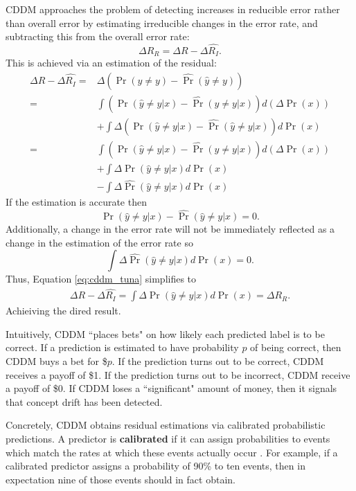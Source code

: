 CDDM approaches the problem of detecting increases in reducible error rather than overall error by estimating irreducible changes in the error rate, and subtracting this from the overall error rate:
\begin{equation}
	\Delta R_R = \Delta R - \Delta \hat{R_I}.
\end{equation}
This is achieved via an estimation of the residual:
\begin{align}
	\Delta R - \Delta \hat{R_I} =& \Delta \left( \Pr(\hat{y}\ne y) - \hat{\Pr}(\hat{y}\ne y) \right) \label{eq:cddm_tuna} \\
	=& \int \left( \Pr(\hat{y}\ne y|x) - \hat{\Pr}(\hat{y}\ne y|x) \right) d\left(\Delta \Pr(x)\right) \\
	 &+ \int \Delta \left( \Pr(\hat{y}\ne y|x) - \hat{\Pr}(\hat{y}\ne y|x) \right) d\Pr(x) \\
	=& \int \left( \Pr(\hat{y}\ne y|x) - \hat{\Pr}(\hat{y}\ne y|x) \right) d\left(\Delta \Pr(x)\right) \\
	 &+ \int \Delta \Pr(\hat{y}\ne y|x) d\Pr(x) \\
	 &- \int \Delta \hat{\Pr}(\hat{y}\ne y|x) d\Pr(x)
\end{align}
If the estimation is accurate then
\begin{equation}
	\Pr(\hat{y}\ne y|x) - \hat{\Pr}(\hat{y}\ne y|x) = 0.
\end{equation}
Additionally, a change in the error rate will not be immediately reflected as a change in the estimation of the error rate so 
\begin{equation}
	 \int \Delta \hat{\Pr}(\hat{y}\ne y|x) d\Pr(x) = 0.
\end{equation}
Thus, Equation \ref{eq:cddm_tuna} simplifies to
\begin{align}
	\Delta R - \Delta \hat{R_I} = \int \Delta \Pr(\hat{y}\ne y|x) d\Pr(x) = \Delta R_R.
\end{align}
Achieiving the dired result.

Intuitively, CDDM ``places bets" on how likely each predicted label is to be correct. If a prediction is estimated to have probability $p$ of being correct, then CDDM buys a bet for \$$p$. If the prediction turns out to be correct, CDDM receives a payoff of \$1. If the prediction turns out to be incorrect, CDDM receive a payoff of \$0. If CDDM loses a ``significant" amount of money, then it signals that concept drift has been detected.

Concretely, CDDM obtains residual estimations via calibrated probabilistic predictions. A predictor is {\bf calibrated} if it can assign probabilities to events which match the rates at which these events actually occur \cite{superforecasting}\cite{scoring_rules}\cite{calibrating}. For example, if a calibrated predictor assigns a probability of 90\% to ten events, then in expectation nine of those events should in fact obtain. 

